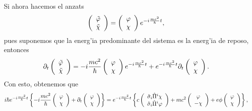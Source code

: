 Si ahora hacemos el anzats
\begin{equation}
\left(
\begin{array}
[c]{c}%
\tilde{\varphi}\\
\tilde{\chi}%
\end{array}
\right) =\left(
\begin{array}
[c]{c}%
\varphi\\
\chi
\end{array}
\right) e^{-i\frac{mc^2}{\hbar}t},
\end{equation}
pues suponemos que la energ'ia predominante del sistema es la energ'ia
de reposo, entonces
\begin{equation}
\partial_{t}\left(
\begin{array}
[c]{c}%
\tilde{\varphi}\\
\tilde{\chi}%
\end{array}
\right) =-i\frac{mc^2}{\hbar}\left(
\begin{array}
[c]{c}%
\varphi\\
\chi
\end{array}
\right) e^{-i\frac{mc^2}{\hbar}t}+e^{-i\frac{mc^2}{\hbar}%
t}\partial_{t}\left(
\begin{array}
[c]{c}%
\varphi\\
\chi
\end{array}
\right).
\end{equation}
Con esto, obtenemos que
\begin{equation}
i\hbar e^{-i\frac{mc^2}{\hbar}t}\left\{ -i\frac{mc^2}{\hbar}\left(
\begin{array}
[c]{c}%
\varphi\\
\chi
\end{array}
\right)+\partial_{t}\left(
\begin{array}
[c]{c}%
\varphi\\
\chi
\end{array}
\right) \right\} =e^{-i\frac{mc^2}{\hbar}t}\left\{c\left(
\begin{array}
[c]{c}%
\hat{\sigma}_i\hat{\Pi}^i\chi\\
\hat{\sigma}_i\hat{\Pi}^i\varphi
\end{array}
\right) +mc^2\left(
\begin{array}
[c]{c}%
\varphi\\
-\chi
\end{array}
\right) +e\phi\left(
\begin{array}
[c]{c}%
\varphi\\
\chi
\end{array}
\right)\right\},
\end{equation}
